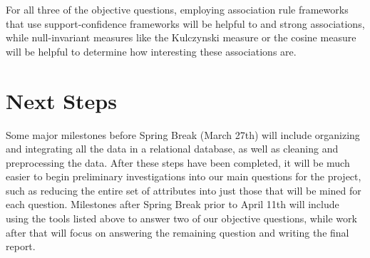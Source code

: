\quad For all three of the objective questions, employing association rule frameworks that use support-confidence frameworks will be helpful to and strong associations, while null-invariant measures like the Kulczynski measure or the cosine measure will be helpful to determine how interesting these associations are.

\section{Next Steps}

\quad Some major milestones before Spring Break (March 27th) will include organizing and integrating all the data in a relational database, as well as cleaning and preprocessing the data. After these steps have been completed, it will be much easier to begin preliminary investigations into our main questions for the project, such as reducing the entire set of attributes into just those that will be mined for each question. Milestones after Spring Break prior to April 11th will include using the tools listed above to answer two of our objective questions, while work after that will focus on answering the remaining question and writing the final report.


%



